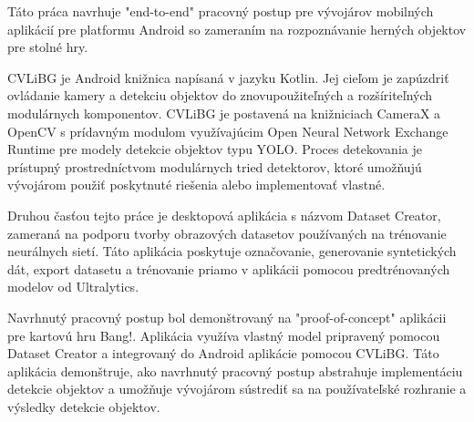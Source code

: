 Táto práca navrhuje "end-to-end" pracovný postup pre vývojárov mobilných aplikácií pre platformu Android so zameraním na rozpoznávanie herných objektov pre stolné hry.

CVLiBG je Android knižnica napísaná v jazyku Kotlin. Jej cieľom je zapúzdriť ovládanie kamery a detekciu objektov do znovupoužiteľných a rozšíriteľných modulárnych komponentov. CVLiBG je postavená na knižniciach CameraX a OpenCV s prídavným modulom využívajúcim Open Neural Network Exchange Runtime pre modely detekcie objektov typu YOLO. Proces detekovania je prístupný prostredníctvom modulárnych tried detektorov, ktoré umožňujú vývojárom použiť poskytnuté riešenia alebo implementovať vlastné.

Druhou časťou tejto práce je desktopová aplikácia s názvom Dataset Creator, zameraná na podporu tvorby obrazových datasetov používaných na trénovanie neurálnych sietí. Táto aplikácia poskytuje označovanie, generovanie syntetických dát, export datasetu a trénovanie priamo v aplikácii pomocou predtrénovaných modelov od Ultralytics.

Navrhnutý pracovný postup bol demonštrovaný na "proof-of-concept" aplikácii pre kartovú hru Bang!. Aplikácia využíva vlastný model pripravený pomocou Dataset Creator a integrovaný do Android aplikácie pomocou CVLiBG.  Táto aplikácia demonštruje, ako navrhnutý pracovný postup abstrahuje implementáciu detekcie objektov a umožňuje vývojárom sústrediť sa na používateľské rozhranie a výsledky detekcie objektov.